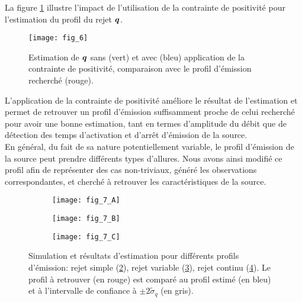   La figure \ref{fig_6_AE} illustre l'impact de l'utilisation de la contrainte de positivité pour l'estimation du profil du rejet ${\bm{q}}$.
  
 \begin{figure}[h!]
 	\centering
 	\texttt{[image: fig\_6]}
 	\caption{Estimation de ${\bm{q}}$ sans (vert) et avec (bleu) application de la contrainte de positivité, comparaison avec le profil d'émission recherché (rouge).}
 	\label{fig_6_AE}
 \end{figure}
 
 L'application de la contrainte de positivité améliore le résultat de l'estimation et permet de retrouver un profil d'émission suffisamment proche de celui recherché pour avoir une bonne estimation, tant en termes d'amplitude du débit que de détection des temps d'activation et d'arrêt d'émission de la source.\\
 
 En général, du fait de sa nature potentiellement variable, le profil d'émission de la source peut prendre différents types d'allures. Nous avons ainsi modifié ce profil afin de représenter des cas non-triviaux, généré les observations correspondantes, et cherché à retrouver les caractéristiques de la source. \\
 
  \begin{figure}[h!]
  	\centering
  	\begin{subfigure}[t]{0.5\textwidth}
  		\centering
  		\texttt{[image: fig\_7\_A]}
  		\caption{}
  		\label{fig_AE_7_A}
  	\end{subfigure}%
  	\begin{subfigure}[t]{0.5\textwidth}
  		\centering
  		\texttt{[image: fig\_7\_B]}
  		\caption{}
  		\label{fig_AE_7_B}
  	\end{subfigure}
  	\begin{subfigure}[t]{0.5\textwidth}
  		\centering
  		\texttt{[image: fig\_7\_C]}
  		\caption{}
  		\label{fig_AE_7_C}
  	\end{subfigure} 
  	
  	\caption{Simulation et résultats d'estimation pour différents profils d'émission: rejet simple (\ref{fig_AE_7_A}), rejet variable (\ref{fig_AE_7_B}), rejet continu (\ref{fig_AE_7_C}). Le profil à retrouver (en rouge) est comparé au profil estimé (en bleu) et à l'intervalle de confiance à $\pm 2 \widetilde{\sigma}_q$ (en gris).}
  	\label{fig_AE_7}	
  \end{figure}
  
